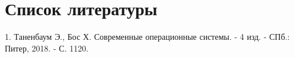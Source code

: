 \newpage
\section*{Список литературы}

1.	Таненбаум Э., Бос Х.  Современные операционные системы. - 4 изд. - СПб.: Питер, 2018. - С. 1120. 